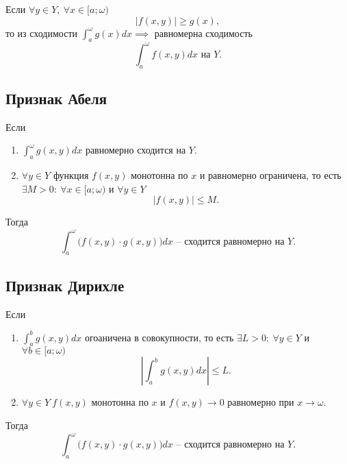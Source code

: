 \begin{corollary}
    Если $\forall y \in Y, \ \forall x \in [a;\omega)$
    \[
        \big|f(x,y)\big| \geqslant g(x),
    \]
    то из сходимости $\int_{a}^{\omega}g(x)dx \implies$ равномерна сходимость
    \[
        \int_{a}^{\omega}f(x,y)dx \text{ на }Y.
    \]
\end{corollary}

\subsection{Признак Абеля}

\begin{theorem}
    Если \begin{enumerate}
        \item $\int_{a}^{\omega}g(x,y)dx$ равномерно сходится на $Y$.
        \item $\forall y \in Y$ функция $f(x,y)$ монотонна по $x$ и равномерно ограничена, то есть $\exists M > 0: \ \forall x \in [a;\omega)$ и $\forall y \in Y$
              \[
                  \left|f(x,y)\right| \leqslant M.
              \]
    \end{enumerate}

    Тогда
    \[
        \int_{a}^{\omega}\big(f(x,y) \cdot g(x,y)\big)dx \text{ -- сходится равномерно на }Y.
    \]
\end{theorem}

\subsection{Признак Дирихле}

\begin{theorem}
    Если
    \begin{enumerate}
        \item $\int_{a}^{b}g(x,y)dx$ огоаничена в совокупности, то есть $\exists L > 0: \ \forall y \in Y$ и $\forall b \in [a;\omega)$
              \[
                  \left|\int_{a}^{b}g(x,y)dx\right| \leqslant L.
              \]
        \item $\forall y \in Y \ f(x,y)$ монотонна по $x$ и $f(x,y) \rightarrow 0$ равномерно при $x \rightarrow \omega$.
    \end{enumerate}

    Тогда
    \[
        \int_{a}^{\omega}\big(f(x,y)\cdot g(x,y)\big)dx \text{ -- сходится равномерно на } Y.
    \]
\end{theorem}